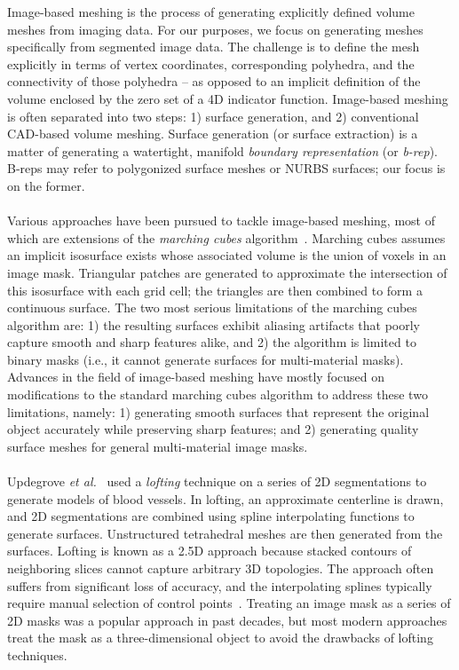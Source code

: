 %
Image-based meshing is the process of generating explicitly defined volume meshes from imaging data. For our purposes, we focus on generating meshes specifically from segmented image data. The challenge is to define the mesh explicitly in terms of vertex coordinates, corresponding polyhedra, and the connectivity of those polyhedra -- as opposed to an implicit definition of the volume enclosed by the zero set of a 4D indicator function. Image-based meshing is often separated into two steps: 1) surface generation, and 2) conventional CAD-based volume meshing. Surface generation (or surface extraction) is a matter of generating a watertight, manifold \textit{boundary representation} (or \textit{b-rep}). B-reps may refer to polygonized surface meshes or NURBS surfaces; our focus is on the former. \\ \\
%
Various approaches have been pursued to tackle image-based meshing, most of which are extensions of the \textit{marching cubes} algorithm~\cite{lorensen_1987}. Marching cubes assumes an implicit isosurface exists whose associated volume is the union of voxels in an image mask. Triangular patches are generated to approximate the intersection of this isosurface with each grid cell; the triangles are then combined to form a continuous surface. The two most serious limitations of the marching cubes algorithm are: 1) the resulting surfaces exhibit aliasing artifacts that poorly capture smooth and sharp features alike, and 2) the algorithm is limited to binary masks (i.e., it cannot generate surfaces for multi-material masks). Advances in the field of image-based meshing have mostly focused on modifications to the standard marching cubes algorithm to address these two limitations, namely: 1) generating smooth surfaces that represent the original object accurately while preserving sharp features; and 2) generating quality surface meshes for general multi-material image masks. \\ \\ 
%
Updegrove \textit{et al.}~\cite{updegrove_2016} used a \textit{lofting} technique on a series of 2D segmentations to generate models of blood vessels. In lofting, an approximate centerline is drawn, and 2D segmentations are combined using spline interpolating functions to generate surfaces. Unstructured tetrahedral meshes are then generated from the surfaces. Lofting is known as a 2.5D approach because stacked contours of neighboring slices cannot capture arbitrary 3D topologies. The approach often suffers from significant loss of accuracy, and the interpolating splines typically require manual selection of control points~\cite{young_2008}. Treating an image mask as a series of 2D masks was a popular approach in past decades, but most modern approaches treat the mask as a three-dimensional object to avoid the drawbacks of lofting techniques. \\ \\

